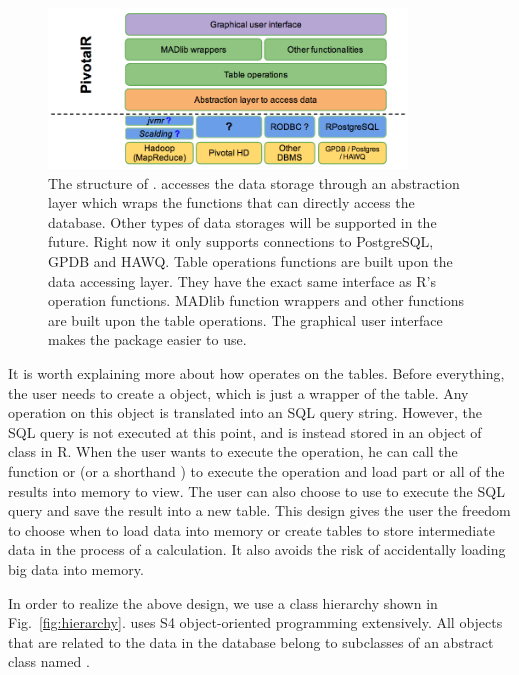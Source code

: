 \begin{figure}[htb]
  \centering
  \includegraphics[width=0.85\textwidth]{PivotalR_structure.png}
  \caption{The structure of .  accesses
    the data storage through an abstraction layer which wraps the
    functions that can directly access the database. Other types of
    data storages will be supported in the future. Right now it only
    supports connections to PostgreSQL, GPDB and HAWQ. Table
    operations functions are built upon the data accessing layer. They
    have the exact same interface as R's  operation
    functions. MADlib function wrappers and other functions are built
    upon the table operations. The graphical user interface makes the
    package easier to use.}
\label{fig:structure}
\end{figure}

It is worth explaining more about how  operates on the
tables. Before everything, the user needs to create a
 object, which is just a wrapper of the
table. Any operation on this object is translated into an SQL query
string. However, the SQL query is not executed at this point, and is
instead stored in an object of class  in R. When the
user wants to execute the operation, he can call the function
 or  (or a shorthand ) to
execute
the operation and load part
or all of the results into memory to view. The user can also choose to
use  to execute the SQL query and save the
result into a new table. This design gives the user the freedom to
choose when to load data into memory or create tables to store
intermediate data in the process of a calculation. It also avoids the
risk of accidentally loading big data into memory.

In order to realize the above design, we use a class hierarchy shown
in Fig.~\ref{fig:hierarchy}.  uses S4 object-oriented
programming extensively. All objects that are related to the data in
the database belong to subclasses of an abstract class named
.

